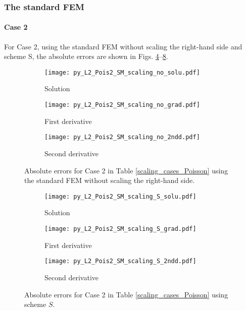 \documentclass[review,3p]{elsarticle}
\begin{document}
\subsubsection{The standard FEM}

\paragraph{Case 2}
For Case 2, using the standard FEM without scaling the right-hand side and scheme S, the absolute errors are shown in Figs. \ref{py_L2_Pois2_SM_scaling_no}--\ref{py_L2_Pois2_SM_scaling_S}.

\begin{figure}[!ht]
    \begin{subfigure}{5.5cm}
        \texttt{[image: py\_L2\_Pois2\_SM\_scaling\_no\_solu.pdf]}
        \caption{Solution}
        \label{py_L2_Pois2_SM_scaling_no_solu}
    \end{subfigure}
    \hspace{-0.2cm}
    \begin{subfigure}{5.5cm}
        \texttt{[image: py\_L2\_Pois2\_SM\_scaling\_no\_grad.pdf]}
        \caption{First derivative}
        \label{py_L2_Pois2_SM_scaling_no_grad}
    \end{subfigure}
    \hspace{-0.2cm}
    \begin{subfigure}{5.5cm}
        \texttt{[image: py\_L2\_Pois2\_SM\_scaling\_no\_2ndd.pdf]}
        \caption{Second derivative}
        \label{py_L2_Pois2_SM_scaling_no_2ndd}
    \end{subfigure}
\caption{Absolute errors for Case 2 in Table \ref{scaling_cases_Poisson} using the standard FEM without scaling the right-hand side.}
\label{py_L2_Pois2_SM_scaling_no}
\end{figure}

\begin{figure}[!ht]
    \begin{subfigure}{5.5cm}
        \texttt{[image: py\_L2\_Pois2\_SM\_scaling\_S\_solu.pdf]}
        \caption{Solution}
        \label{py_L2_Pois2_SM_scaling_S_solu}
    \end{subfigure}
    \hspace{-0.2cm}
    \begin{subfigure}{5.5cm}
        \texttt{[image: py\_L2\_Pois2\_SM\_scaling\_S\_grad.pdf]}
        \caption{First derivative}
        \label{py_L2_Pois2_SM_scaling_S_grad}
    \end{subfigure}
    \hspace{-0.2cm}
    \begin{subfigure}{5.5cm}
        \texttt{[image: py\_L2\_Pois2\_SM\_scaling\_S\_2ndd.pdf]}
        \caption{Second derivative}
        \label{py_L2_Pois2_SM_scaling_S_2ndd}
    \end{subfigure}
\caption{Absolute errors for Case 2 in Table \ref{scaling_cases_Poisson} using scheme $S$.}
\label{py_L2_Pois2_SM_scaling_S}
\end{figure}
\end{document}
